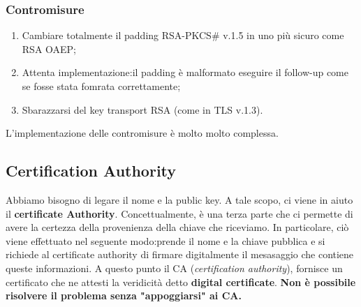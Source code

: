 \documentclass{book}
\theoremstyle{remark}
\begin{document}
\subsubsection{Contromisure}
\begin{enumerate}
	\item Cambiare totalmente il padding RSA-PKCS\# v\@.1\@.5 in uno più sicuro come RSA OAEP;\@
	\item Attenta implementazione:\@se il padding è malformato eseguire il follow-up come se fosse stata fomrata correttamente;\@
	\item Sbarazzarsi del key transport RSA (come in TLS v\@.1\@.3)\@.
\end{enumerate}
L'implementazione delle contromisure è molto molto complessa\@.
\subsection{Certification Authority}
Abbiamo bisogno di legare il nome e la public key\@. A tale scopo, ci viene in aiuto il \textbf{certificate Authority}\@. Concettualmente, è una terza parte che ci permette di avere la certezza della provenienza della chiave che riceviamo\@. In particolare, ciò viene effettuato nel seguente modo:\@si prende il nome e la chiave pubblica e si richiede al certificate authority di firmare digitalmente il mesasaggio che contiene queste informazioni\@. A questo punto il CA (\emph{certification authority}), fornisce un certificato che ne attesti la veridicità detto \textbf{digital certificate}\@.\newline
\textbf{Non è possibile risolvere il problema senza "appoggiarsi" ai CA\@.}\newline
\end{document}
